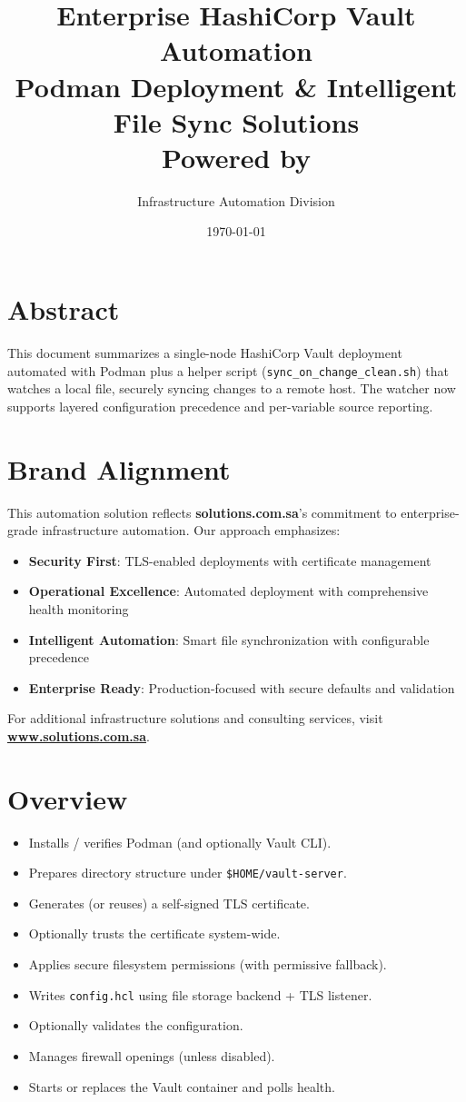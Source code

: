 \documentclass[12pt]{article}
\title{\textcolor{solutionsblue}{\textbf{Enterprise HashiCorp Vault Automation}} \\
       \Large\textcolor{solutionsgray}{Podman Deployment \& Intelligent File Sync Solutions} \\
       \vspace{0.5cm}
       \large Powered by \solutionsbrand}
\author{\textcolor{solutionsgray}{Infrastructure Automation Division}}
\date{\textcolor{solutionsgray}{\today}}
\newcommand{\solutionsbrand}{\textcolor{solutionsblue}{\textbf{solutions.com.sa}}}
\begin{document}
\maketitle
\thispagestyle{fancy}

\section*{Abstract}
This document summarizes a single-node HashiCorp Vault deployment automated with Podman plus a helper script (\texttt{sync\_on\_change\_clean.sh}) that watches a local file, securely syncing changes to a remote host. The watcher now supports layered configuration precedence and per-variable source reporting.

\section*{Brand Alignment}
This automation solution reflects \solutionsbrand{}'s commitment to enterprise-grade infrastructure automation. Our approach emphasizes:
\begin{itemize}
  \item \textcolor{solutionsblue}{\textbf{Security First}}: TLS-enabled deployments with certificate management
  \item \textcolor{solutionsblue}{\textbf{Operational Excellence}}: Automated deployment with comprehensive health monitoring
  \item \textcolor{solutionsblue}{\textbf{Intelligent Automation}}: Smart file synchronization with configurable precedence
  \item \textcolor{solutionsblue}{\textbf{Enterprise Ready}}: Production-focused with secure defaults and validation
\end{itemize}

For additional infrastructure solutions and consulting services, visit\\
\href{https://www.solutions.com.sa}{\textcolor{solutionsblue}{\textbf{www.solutions.com.sa}}}.

\section{Overview}
\begin{itemize}
  \item Installs / verifies Podman (and optionally Vault CLI).
  \item Prepares directory structure under \texttt{\$HOME/vault-server}.
  \item Generates (or reuses) a self-signed TLS certificate.
  \item Optionally trusts the certificate system-wide.
  \item Applies secure filesystem permissions (with permissive fallback).
  \item Writes \texttt{config.hcl} using file storage backend + TLS listener.
  \item Optionally validates the configuration.
  \item Manages firewall openings (unless disabled).
  \item Starts or replaces the Vault container and polls health.
\end{itemize}
\end{document}
